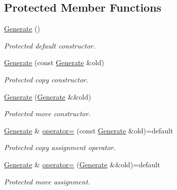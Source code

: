 \subsection*{Protected Member Functions}
\begin{DoxyCompactItemize}
\item 
\mbox{\label{classsamp_files_1_1_generate_a3096583c518c65c4e7cf1c76165fef99}} 
\hyperlink{classsamp_files_1_1_generate_a3096583c518c65c4e7cf1c76165fef99}{Generate} ()
\begin{DoxyCompactList}\small\item\em Protected default constructor. \end{DoxyCompactList}\item 
\hyperlink{classsamp_files_1_1_generate_a3b9ea63228daca88614be36e796ffea1}{Generate} (const \hyperlink{classsamp_files_1_1_generate}{Generate} \&old)
\begin{DoxyCompactList}\small\item\em Protected copy constructor. \end{DoxyCompactList}\item 
\hyperlink{classsamp_files_1_1_generate_a12165e2b614b013d5eba3a893d298cea}{Generate} (\hyperlink{classsamp_files_1_1_generate}{Generate} \&\&old)
\begin{DoxyCompactList}\small\item\em Protected move constructor. \end{DoxyCompactList}\item 
\hyperlink{classsamp_files_1_1_generate}{Generate} \& \hyperlink{classsamp_files_1_1_generate_ab54ff8f5a2c497ce98a31833e2d43d66}{operator=} (const \hyperlink{classsamp_files_1_1_generate}{Generate} \&old)=default
\begin{DoxyCompactList}\small\item\em Protected copy assignment operator. \end{DoxyCompactList}\item 
\hyperlink{classsamp_files_1_1_generate}{Generate} \& \hyperlink{classsamp_files_1_1_generate_a7b7e395a2d6fe5235fe72f7bbc50e2a6}{operator=} (\hyperlink{classsamp_files_1_1_generate}{Generate} \&\&old)=default
\begin{DoxyCompactList}\small\item\em Protected move assignment. \end{DoxyCompactList}\end{DoxyCompactItemize}


